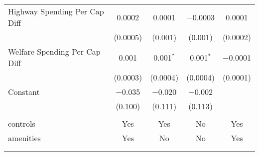\begin{table}[!htbp]
\begin{tabular}{@{\extracolsep{5pt}}lcccc}
  Highway Spending Per Cap Diff & 0.0002 & 0.0001 & $-$0.0003 & 0.0001 \\ 
  & (0.0005) & (0.001) & (0.001) & (0.0002) \\ 
  Welfare Spending Per Cap Diff & 0.001 & 0.001$^{*}$ & 0.001$^{*}$ & $-$0.0001 \\ 
  & (0.0003) & (0.0004) & (0.0004) & (0.0001) \\ 
  Constant & $-$0.035 & $-$0.020 & $-$0.002 &  \\ 
  & (0.100) & (0.111) & (0.113) &  \\ 
 \hline \\[-1.8ex] 
controls & Yes & Yes & No & Yes \\ 
amenities & Yes & No & No & Yes \\ 
\hline \\[-1.8ex] 
\hline 
\hline \\[-1.8ex] 
\end{tabular} 
\end{table} 
